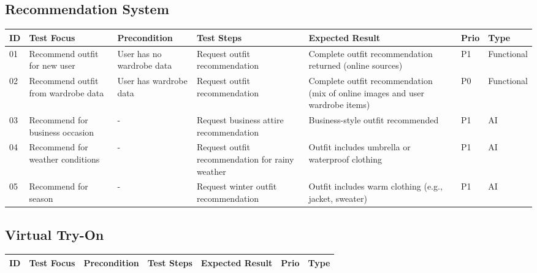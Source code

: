 \begin{appendices}
\begin{landscape}
\subsection*{Recommendation System}

\begin{longtable}{|p{0.8cm}|p{2.8cm}|p{2.5cm}|p{6cm}|p{5cm}|p{1.2cm}|p{1.8cm}|}
\hline
\textbf{ID} & \textbf{Test Focus} & \textbf{Precondition} & \textbf{Test Steps} & \textbf{Expected Result} & \textbf{Prio} & \textbf{Type} \\
\hline

01 & Recommend outfit for new user & User has no wardrobe data & Request outfit recommendation & Complete outfit recommendation returned (online sources) & P1 & Functional \\
\hline
02 & Recommend outfit from wardrobe data & User has wardrobe data & Request outfit recommendation & Complete outfit recommendation (mix of online images and user wardrobe items) & P0 & Functional \\
\hline
03 & Recommend for business occasion & - & Request business attire recommendation & Business-style outfit recommended & P1 & AI \\
\hline
04 & Recommend for weather conditions & - & Request outfit recommendation for rainy weather & Outfit includes umbrella or waterproof clothing & P1 & AI \\
\hline
05 & Recommend for season & - & Request winter outfit recommendation & Outfit includes warm clothing (e.g., jacket, sweater) & P1 & AI \\
\hline
\end{longtable}
\end{landscape}

\begin{landscape}
\subsection*{Virtual Try-On}

\begin{longtable}{|p{0.8cm}|p{2.8cm}|p{2.5cm}|p{6cm}|p{5cm}|p{1.2cm}|p{1.8cm}|}
\hline
\textbf{ID} & \textbf{Test Focus} & \textbf{Precondition} & \textbf{Test Steps} & \textbf{Expected Result} & \textbf{Prio} & \textbf{Type} \\
\hline


\end{longtable}
\end{landscape}
\end{appendices}
